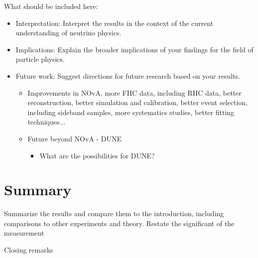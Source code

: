 What should be included here:
\begin{itemize}
\item Interpretation: Interpret the results in the context of the current understanding of neutrino physics.
\item Implications: Explain the broader implications of your findings for the field of particle physics.
\item Future work: Suggest directions for future research based on your results.
\begin{itemize}
\item Improvements in NOvA, more FHC data, including RHC data, better reconstruction, better simulation and calibration, better event selection, including sideband samples, more systematics studies, better fitting techniques...
\item Future beyond NOvA - DUNE
\begin{itemize}
\item What are the possibilities for DUNE?
\end{itemize}
\end{itemize}
\end{itemize}



\section{Summary}\label{sec:NuMMConclusion}

Summarize the results and compare them to the introduction, including comparisons to other experiments and theory. Restate the significant of the measurement

Closing remarks